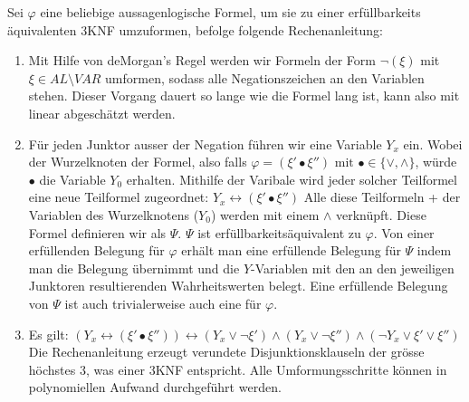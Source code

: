 \documentclass[a4paper,10pt]{article}
\begin{document}
	Sei $\varphi$ eine beliebige aussagenlogische Formel, um sie zu einer erf\"ullbarkeits
	\"aquivalenten 3KNF umzuformen, befolge folgende Rechenanleitung:
	\begin{enumerate}
		\item 	Mit Hilfe von deMorgan's Regel werden wir Formeln der Form 
			$\lnot(\xi)$ mit $\xi \in AL\setminus VAR$ umformen, sodass alle 
			Negationszeichen an den Variablen stehen. 
			Dieser Vorgang dauert so lange wie die Formel lang ist, kann also mit
			linear abgesch\"atzt werden.
		\item   F\"ur jeden Junktor ausser der Negation f\"uhren wir eine 
			Variable $Y_x$ ein. Wobei der Wurzelknoten der Formel, also falls 
			$\varphi = (\xi' \bullet \xi'') \text{ mit } \bullet \in \{\lor, \land\}$, 
			würde $\bullet$ die Variable 
			$Y_0$ erhalten. Mithilfe der Varibale wird jeder solcher Teilformel 
			eine neue Teilformel zugeordnet: 
			$Y_x \leftrightarrow (\xi' \bullet \xi'')$
			Alle diese Teilformeln + der Variablen des Wurzelknotens ($Y_0$) werden mit einem $\land$ verkn\"upft. Diese 
			Formel definieren wir als $\Psi$. 
			$\Psi$ ist erfüllbarkeits\"aquivalent zu 
			$\varphi$. Von einer erfüllenden Belegung f\"ur $\varphi$ erh\"alt 
			man eine erfüllende Belegung f\"ur $\Psi$ indem man die Belegung 
			\"ubernimmt und die $Y$-Variablen mit den an den jeweiligen Junktoren 
			resultierenden Wahrheitswerten belegt. Eine erf\"ullende Belegung von 
			$\Psi$ ist auch trivialerweise auch eine f\"ur $\varphi$.
		\item	Es gilt: $(Y_x \leftrightarrow (\xi' \bullet \xi'')) 
			\leftrightarrow (Y_x \lor \lnot \xi') \land (Y_x \lor \lnot \xi'') 				\land (\lnot Y_x \lor \xi' \lor \xi'')$
Die Rechenanleitung erzeugt verundete Disjunktionsklauseln der gr\"osse h\"ochstes 3, was einer 3KNF entspricht. Alle Umformungsschritte k\"onnen in polynomiellen Aufwand durchgeführt werden.
			
	\end{enumerate}
\end{document}
